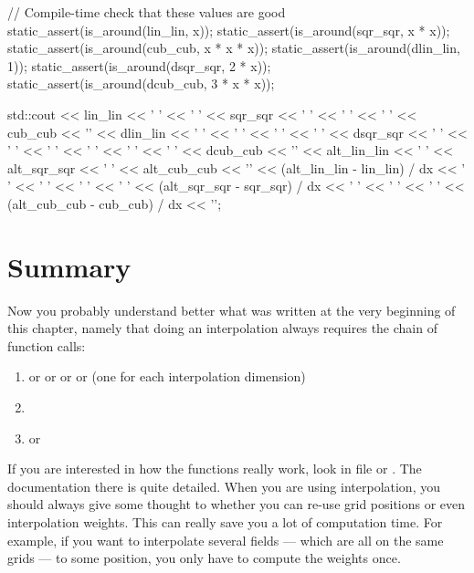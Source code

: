 \begin{code}
{  // Compile-time check that these values are good
  static_assert(is_around(lin_lin, x));
  static_assert(is_around(sqr_sqr, x * x));
  static_assert(is_around(cub_cub, x * x * x));
  static_assert(is_around(dlin_lin, 1));
  static_assert(is_around(dsqr_sqr, 2 * x));
  static_assert(is_around(dcub_cub, 3 * x * x));

  std::cout << lin_lin << ' ' << ' ' << sqr_sqr << ' ' << ' ' << ' ' << cub_cub
            << '\n'
            << dlin_lin << ' ' << ' ' << ' ' << ' ' << dsqr_sqr << ' ' << ' '
            << ' ' << ' ' << ' ' << ' ' << dcub_cub << '\n'
            << alt_lin_lin << ' ' << alt_sqr_sqr << ' ' << alt_cub_cub << '\n'
            << (alt_lin_lin - lin_lin) / dx << ' ' << ' ' << ' ' << ' '
            << (alt_sqr_sqr - sqr_sqr) / dx << ' ' << ' ' << ' '
            << (alt_cub_cub - cub_cub) / dx << '\n';
}
\end{code}


\section{Summary}

Now you probably understand better what was written at the very
beginning of this chapter, namely that doing an interpolation always
requires the chain of function calls:
\begin{enumerate}
\item {} or  or  or  or  (one for each interpolation dimension)
\item {}
\item {} or 
\end{enumerate}
If you are interested in how the functions really work, look in file
 or .
The documentation there is quite detailed.  When you are using
interpolation, you should always give some thought to whether you can
re-use grid positions or even interpolation weights. This can really
save you a lot of computation time. For example, if you want to
interpolate several fields --- which are all on the same grids --- to
some position, you only have to compute the weights once.



